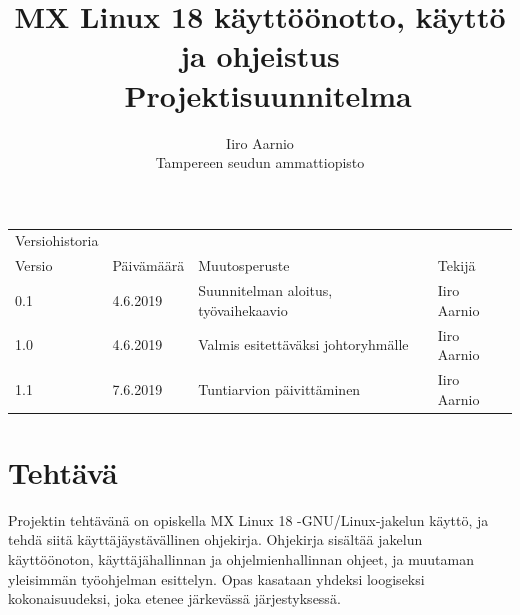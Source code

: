 \documentclass[a4paper, 12pt, finnish]{article}
\begin{document}
\title{MX Linux 18 käyttöönotto, käyttö ja ohjeistus \\ \large Projektisuunnitelma}
\author{Iiro Aarnio\\ Tampereen seudun ammattiopisto}
\maketitle
\thispagestyle{empty}
\newpage
\thispagestyle{empty}
\newpage
\begin{table}[htpb]
\begin{tabular}{llll}
Versiohistoria &            &                         &             \\
\rowcolor[HTML]{FFCCC9}
Versio         & Päivämäärä & Muutosperuste           & Tekijä      \\
0.1              & 4.6.2019   & Suunnitelman aloitus, työvaihekaavio       & Iiro Aarnio \\
1.0 & 4.6.2019 & Valmis esitettäväksi johtoryhmälle & Iiro Aarnio \\
1.1 & 7.6.2019 & Tuntiarvion päivittäminen  & Iiro Aarnio \\
\end{tabular}
\end{table}

\newpage
\thispagestyle{empty}
\tableofcontents
\newpage
\section{Tehtävä}
Projektin tehtävänä on opiskella MX Linux 18 -GNU/Linux-jakelun käyttö, ja tehdä siitä käyttäjäystävällinen ohjekirja. Ohjekirja sisältää jakelun käyttöönoton, käyttäjähallinnan ja ohjelmienhallinnan ohjeet, ja muutaman yleisimmän työohjelman esittelyn. Opas kasataan yhdeksi loogiseksi kokonaisuudeksi, joka etenee järkevässä järjestyksessä.
\end{document}
